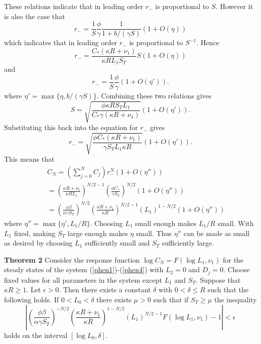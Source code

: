 \documentclass{article}
\begin{document}
These relations indicate that in leading order $r_-$ is proportional to $S$.
However it is also the case that
\begin{equation}
r_-=\frac{1}{S}\frac{\phi}{\gamma}\frac{1}{1+b/(\gamma S)}(1+O(\eta))
\end{equation}
which indicates that in leading order $r_-$ is proportional to $S^{-1}$.
Hence
\begin{equation}
r_-=\frac{C_*(\kappa R+\nu_1)}{\kappa RL_1S_T}S(1+O(\eta))
\end{equation}
and 
\begin{equation}
r_-=\frac{1}{S}\frac{\phi}{\gamma}(1+O(\eta')).
\end{equation}
where $\eta'=\max\{\eta,b/(\gamma S)\}$.
Combining these two relations gives
\begin{equation}
S=\sqrt{\frac{\phi\kappa RS_TL_1}{C_*\gamma (\kappa R+\nu_1)}}(1+O(\eta')).
\end{equation}
Substituting this back into the equation for $r_-$ gives
\begin{equation}
r_-=\sqrt{\frac{\phi C_*(\kappa R+\nu_1)}
{\gamma S_TL_1\kappa R}}(1+O(\eta')).
\end{equation}
This means that
\begin{eqnarray}
&&C_N=(\sum_{j=0}^N C_j)r_-^N(1+O(\eta''))\nonumber\\
&&=\left(\frac{\kappa R+\nu_1}{\kappa RL_1}\right)^{N/2-1}
\left(\frac{\phi C_*}{\gamma S_T}\right)^{N/2}(1+O(\eta''))\nonumber\\
&&=\left(\frac{\phi \beta}{\alpha\gamma S_T}\right)^{N/2}
\left(\frac{\kappa R+\nu_1}{\kappa R}\right)^{N/2-1}(L_1)^{1-N/2}(1+O(\eta''))
\end{eqnarray}
where $\eta''=\max\{\eta',L_1/R\}$. Choosing $L_1$ small enough makes 
$L_1/R$ small. With $L_1$ fixed, making $S_T$ large enough makes $\eta$ small. 
Thus $\eta''$ can be made as small as desired by choosing
$L_1$ sufficiently small and $S_T$ sufficiently large.

\noindent
{\bf Theorem 2} Consider the response function $\log C_N=F(\log L_1,\nu_1)$ 
for the steady states of the system (\ref{phen1})-(\ref{phen4}) with $L_2=0$
and $D_j=0$. Choose fixed values for all parameters in the system except 
$L_1$ and $S_T$. Suppose that $\kappa R\ge 1$. Let $\epsilon>0$. Then there 
exists a constant $\delta$ with $0<\delta\le R$ such 
that the following holds. If $0<L_0<\delta$ there exists $\mu>0$ such that if 
$S_T\ge\mu$ the inequality 
\begin{equation}
\left|\left(\frac{\phi \beta}{\alpha\gamma S_T}\right)^{-N/2}
\left(\frac{\kappa R+\nu_1}{\kappa R}\right)^{1-N/2}(L_1)^{N/2-1}
F(\log L_1,\nu_1)-1\right|<\epsilon 
\end{equation}
holds on the interval $[\log L_0,\delta]$.
\end{document}

